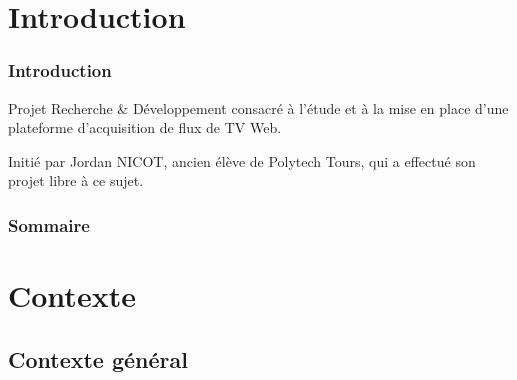 \documentclass{beamer}
\begin{document}


\title[]{}
\subtitle{Première soutenance de PR\&D}
\author{Romain ROUSSEAU}
\date{\today}

\begin{frame}
	
	\maketitle
	
\end{frame}



\section*{Introduction}


\begin{frame}

\frametitle{Introduction}

Projet Recherche \& Développement consacré à l'étude et à la mise en place d'une plateforme d'acquisition de flux de TV Web.

Initié par Jordan NICOT, ancien élève de Polytech Tours, qui a effectué son projet libre à ce sujet.

\end{frame}


\begin{frame}

\frametitle{Sommaire}

\tableofcontents


\end{frame}



\section{Contexte}

\subsection{Contexte général}
\end{document}
